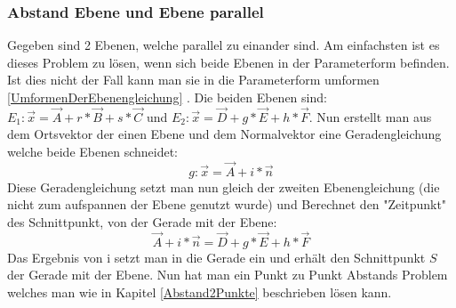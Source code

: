 \documentclass{article}
\begin{document}
\subsubsection{Abstand Ebene und Ebene parallel}
Gegeben sind 2 Ebenen, welche parallel zu einander sind. Am einfachsten ist es dieses Problem zu lösen, wenn sich beide Ebenen in der Parameterform befinden. Ist dies nicht der Fall kann man sie in die Parameterform umformen \ref{UmformenDerEbenengleichung} .
Die beiden Ebenen sind: $E_1 : \vec{x} = \vec{A} + r * \vec{B} + s * \vec{C}$ und $E_2 : \vec{x} = \vec{D} + g * \vec{E} + h * \vec{F}$. Nun erstellt man aus dem Ortsvektor der einen Ebene und dem Normalvektor eine Geradengleichung welche beide Ebenen schneidet:
\begin{equation}
g : \vec{x} = \vec{A} + i * \vec{n}
\end{equation}
Diese Geradengleichung setzt man nun gleich der zweiten Ebenengleichung (die nicht zum aufspannen der Ebene genutzt wurde) und Berechnet den "Zeitpunkt" des Schnittpunkt, von der Gerade mit der Ebene:
\begin{equation}
\vec{A} + i * \vec{n} = \vec{D} + g * \vec{E} + h * \vec{F} 
\end{equation} 
Das Ergebnis von i setzt man in die Gerade ein und erhält den Schnittpunkt $S$ der Gerade mit der Ebene. Nun hat man ein Punkt zu Punkt Abstands Problem welches man wie in Kapitel \ref{Abstand2Punkte} beschrieben lösen kann.
\end{document}
